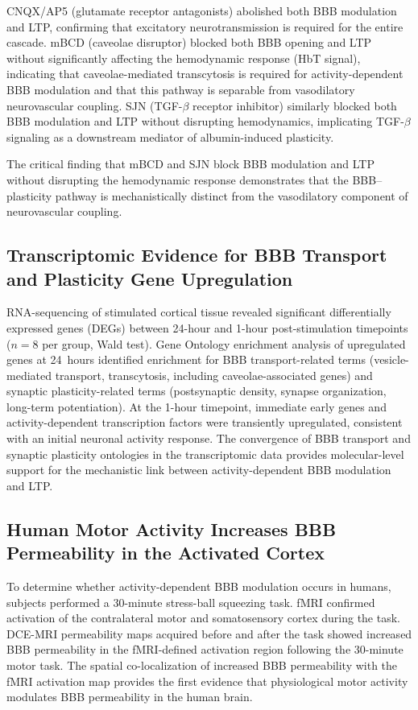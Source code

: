 \documentclass[11pt]{article}
\begin{document}
CNQX/AP5 (glutamate receptor antagonists) abolished both BBB modulation and LTP, confirming that excitatory neurotransmission is required for the entire cascade. mBCD (caveolae disruptor) blocked both BBB opening and LTP without significantly affecting the hemodynamic response (HbT signal), indicating that caveolae-mediated transcytosis is required for activity-dependent BBB modulation and that this pathway is separable from vasodilatory neurovascular coupling. SJN (TGF-$\beta$ receptor inhibitor) similarly blocked both BBB modulation and LTP without disrupting hemodynamics, implicating TGF-$\beta$ signaling as a downstream mediator of albumin-induced plasticity.

The critical finding that mBCD and SJN block BBB modulation and LTP without disrupting the hemodynamic response demonstrates that the BBB--plasticity pathway is mechanistically distinct from the vasodilatory component of neurovascular coupling.

\subsection{Transcriptomic Evidence for BBB Transport and Plasticity Gene Upregulation}

RNA-sequencing of stimulated cortical tissue revealed significant differentially expressed genes (DEGs) between 24-hour and 1-hour post-stimulation timepoints ($n = 8$ per group, Wald test). Gene Ontology enrichment analysis of upregulated genes at 24~hours identified enrichment for BBB transport-related terms (vesicle-mediated transport, transcytosis, including caveolae-associated genes) and synaptic plasticity-related terms (postsynaptic density, synapse organization, long-term potentiation). At the 1-hour timepoint, immediate early genes and activity-dependent transcription factors were transiently upregulated, consistent with an initial neuronal activity response. The convergence of BBB transport and synaptic plasticity ontologies in the transcriptomic data provides molecular-level support for the mechanistic link between activity-dependent BBB modulation and LTP.

\subsection{Human Motor Activity Increases BBB Permeability in the Activated Cortex}

To determine whether activity-dependent BBB modulation occurs in humans, subjects performed a 30-minute stress-ball squeezing task. fMRI confirmed activation of the contralateral motor and somatosensory cortex during the task. DCE-MRI permeability maps acquired before and after the task showed increased BBB permeability in the fMRI-defined activation region following the 30-minute motor task. The spatial co-localization of increased BBB permeability with the fMRI activation map provides the first evidence that physiological motor activity modulates BBB permeability in the human brain.
\end{document}

